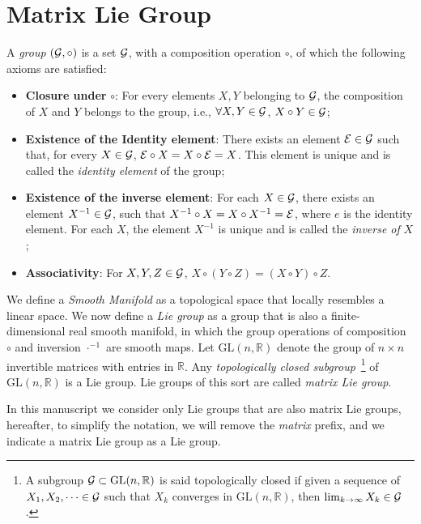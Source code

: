 \section{Matrix Lie Group}
A \emph{group} $(\mathcal{G}, \circ)$ is a set $\mathcal{G}$, with a composition operation $\circ$, of which the following axioms are satisfied:
\begin{itemize}
    \item \textbf{Closure under} $\mathbb{\circ}$: For every elements $X,Y$ belonging to $\mathcal{G}$, the composition of $X$ and $Y$ belongs to the group, i.e., $\forall X,Y \in \mathcal{G}$,  $X \circ Y \in \mathcal{G}$;
    \item \textbf{Existence of the Identity element}: There exists an element $\mathcal{E} \in \mathcal{G}$ such that, for every $X \in \mathcal{G}$, $\mathcal{E} \circ X = X \circ \mathcal{E} = X$. This element is unique and is called the \emph{identity element} of the group;
    \item \textbf{Existence of the inverse element}: For each $X \in \mathcal{G}$, there exists an element $X^{-1} \in \mathcal{G}$, such that $X ^ {-1} \circ X = X \circ X ^ {-1} = \mathcal{E} $, where $e$ is the identity element. For each $X$, the element $X ^ {-1}$ is unique and is called the \emph{inverse of} $X$;
    \item \textbf{Associativity}: For $X,Y,Z \in \mathcal{G}$, $X \circ (Y \circ Z) = (X\circ Y ) \circ Z$.
\end{itemize}
\par 
We define a \emph{Smooth Manifold} as a topological space that locally resembles a linear space. We now define a \emph{Lie group} as a group that is also a finite-dimensional real smooth manifold, in which the group operations of composition $\circ$ and inversion $\cdot^{-1}$ are smooth maps.
Let $\mathrm{GL}(n, \mathbb{R})$ denote the group of $n \times n$ invertible matrices with entries in $\mathbb{R}$. Any \emph{topologically closed subgroup}~\footnote{A subgroup $\mathcal{G} \subset \mathrm{GL}(n, \mathbb{R})$ is said topologically closed if given a sequence of $X_1, X_2, \dots \in \mathcal{G}$ such that $X_k$ converges in $\mathrm{GL}(n, \mathbb{R})$, then $\lim _ {k\rightarrow \infty} X_k \in \mathcal{G}$.} of $\mathrm{GL}(n, \mathbb{R})$ is a Lie group. Lie groups of this sort are called \emph{matrix Lie group}.
\par
In this manuscript we consider only Lie groups that are also matrix Lie groups, hereafter, to simplify the notation, we will remove the \emph{matrix} prefix, and we indicate a matrix Lie group as a Lie group. 


